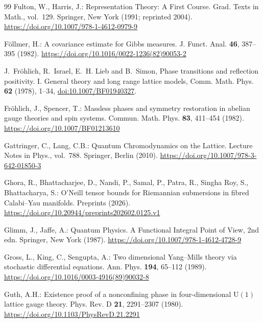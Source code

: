 \documentclass[11pt]{amsart}
\theoremstyle{definition}
\theoremstyle{remark}
\numberwithin{equation}{section}
\newcommand{\U}{\mathrm{U}}
\begin{document}
\begin{thebibliography}{99}
Fulton, W., Harris, J.: Representation Theory: A First Course. Grad. Texts
in Math., vol.~129. Springer, New York (1991; reprinted 2004).
\href{https://doi.org/10.1007/978-1-4612-0979-9}{https://doi.org/10.1007/978-1-4612-0979-9}

F\"ollmer, H.: A covariance estimate for Gibbs measures. J. Funct. Anal. \textbf{46}, 387--395 (1982). \href{https://doi.org/10.1016/0022-1236(82)90053-2}{https://doi.org/10.1016/0022-1236(82)90053-2}

J.~Fr\"ohlich, R.~Israel, E.~H. Lieb and B.~Simon, Phase transitions and
reflection positivity. I. General theory and long range lattice models,
Comm. Math. Phys. \textbf{62} (1978), 1--34,
\href{https://doi.org/10.1007/BF01940327}{doi:10.1007/BF01940327}.

Fr\"ohlich, J., Spencer, T.: Massless phases and symmetry restoration in abelian gauge theories and spin systems. Commun. Math. Phys. \textbf{83}, 411--454 (1982). \href{https://doi.org/10.1007/BF01213610}{https://doi.org/10.1007/BF01213610}

Gattringer, C., Lang, C.B.: Quantum Chromodynamics on the Lattice. Lecture
Notes in Phys., vol.~788. Springer, Berlin (2010).
\href{https://doi.org/10.1007/978-3-642-01850-3}{https://doi.org/10.1007/978-3-642-01850-3}

Ghora, R., Bhattacharjee, D., Nandi, P., Samal, P., Patra, R., Singha Roy, S., Bhattacharya, S.: O'Neill tensor bounds for Riemannian submersions in fibred Calabi--Yau manifolds. Preprints (2026). \href{https://doi.org/10.20944/preprints202602.0125.v1}{https://doi.org/10.20944/preprints202602.0125.v1}

Glimm, J., Jaffe, A.: Quantum Physics. A Functional Integral Point of
View, 2nd edn. Springer, New York (1987).
\href{https://doi.org/10.1007/978-1-4612-4728-9}{https://doi.org/10.1007/978-1-4612-4728-9}

Gross, L., King, C., Sengupta, A.: Two dimensional Yang--Mills theory via stochastic differential equations. Ann. Phys. \textbf{194}, 65--112 (1989). \href{https://doi.org/10.1016/0003-4916(89)90032-8}{https://doi.org/10.1016/0003-4916(89)90032-8}

Guth, A.H.: Existence proof of a nonconfining phase in four-dimensional $\U(1)$ lattice gauge theory. Phys. Rev. D \textbf{21}, 2291--2307 (1980). \href{https://doi.org/10.1103/PhysRevD.21.2291}{https://doi.org/10.1103/PhysRevD.21.2291}


\end{thebibliography}
\end{document}
